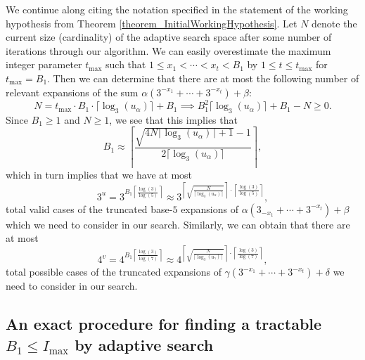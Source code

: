 \documentclass[12pt]{article}
\begin{document}
We continue along citing the notation specified in the statement of the working hypothesis from 
Theorem \ref{theorem_InitialWorkingHypothesis}. 
Let $N$ denote the current size (cardinality) of the adaptive search space after some number of 
iterations through our algorithm. We can easily overestimate the maximum integer parameter 
$t_{\max}$ such that $1 \leq x_1 < \cdots < x_t < B_1$ by $1 \leq t \leq t_{\max}$ for $t_{\max} = B_1$. 
Then we can determine that there are at most the following number of relevant expansions of the sum 
$\alpha(3^{-x_1}+\cdots+3^{-x_t}) + \beta$: 
\[
N = t_{\max} \cdot B_1 \cdot \lceil \log_3(u_{\alpha}) \rceil + B_1 \implies 
     B_1^2 \lceil \log_3(u_{\alpha}) \rceil + B_1 - N \geq 0. 
\]
Since $B_1 \geq 1$ and $N \geq 1$, we see that this implies that 
\[
B_1 \approx \left\lceil \frac{\sqrt{4N \lceil \log_3(u_{\alpha}) \rceil+1}-1}{ 
     2 \lceil \log_3(u_{\alpha}) \rceil}\right\rceil, 
\]
which in turn implies that we have at most 
\[
3^u = 3^{B_1 \left\lceil \frac{\log(3)}{\log(5)} \right\rceil} \approx 
     3^{\left\lceil \sqrt{\frac{N}{\lceil \log_3(u_{\alpha}) \rceil}} \right\rceil 
     \cdot \left\lceil \frac{\log(3)}{\log(5)} \right\rceil}, 
\]
total valid cases of the truncated base-$5$ expansions of $\alpha(3_{-x_1}+\cdots+3^{-x_t}) + \beta$ 
which we need to consider in our search. 
Similarly, we can obtain that there are at most 
\[
4^v = 4^{B_1 \left\lceil \frac{\log(3)}{\log(7)} \right\rceil} \approx 
     4^{\left\lceil \sqrt{\frac{N}{\lceil \log_3(u_{\gamma}) \rceil}} \right\rceil 
     \cdot \left\lceil \frac{\log(3)}{\log(7)} \right\rceil}, 
\] 
total possible cases of the truncated expansions of 
$\gamma(3^{-x_1}+\cdots+3^{-x_t}) + \delta$ we need to consider in our search. 

\subsection{An exact procedure for finding a tractable $B_1 \leq I_{\max}$ by adaptive search} 
\label{SubSection_ArgConvOfB1} 
\end{document}
